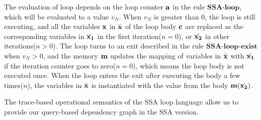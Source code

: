 The evaluation of loop depends on the loop counter ${\bf{{a}}}$ in the rule $\textbf{SSA-loop}$, which will be evaluated to a value $v_N$. When $v_N$ is greater than 0, the loop is still executing, and all the variables ${\bf{{x}}}$ in $\bar{{\bf{{x}}}}$ of the loop body ${\bf{{c}}}$ are replaced as the corresponding variables in $\bar{{\bf{{x_1}}}}$ in the first iteration($n=0$), or $\bar{{\bf{{x_2}}}}$ in other iterations($n > 0$). The loop turns to an exit described in the rule $\textbf{SSA-loop-exist}$ when $v_N > 0$, and the memory ${\bf{{m}}}$ updates the mapping of variables in $\bar{{\bf{{x}}}}$ with $\bar{{\bf{{x_1}}}}$ if the iteration counter goes to zero($n=0$), which means the loop body is not executed once. When the loop enters the exit after executing the body a few times($n$), the variables in $\bar{{\bf{{x}}}}$ is instantiated with the value from the body ${\bf{{m}}}(\bar{{\bf{{x_2}}}})$. 

 The trace-based operational semantics of the SSA loop language allow us to provide our query-based dependency graph in the SSA version.

